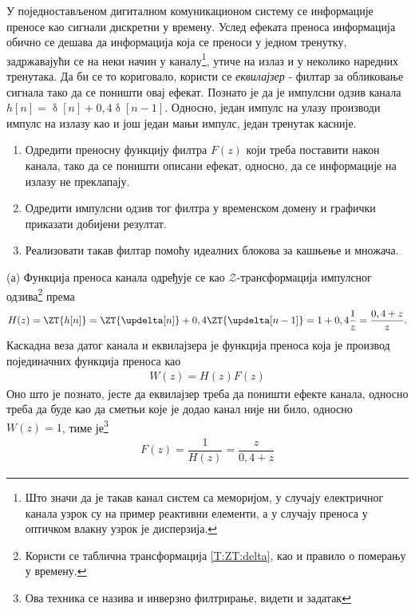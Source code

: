 \PID
У поједностављеном дигиталном комуникационом систему се информације преносе као сигнали дискретни у времену. 
Услед ефеката преноса информација обично се дешава да информација која се 
преноси у једном тренутку, задржавајући се на неки начин у каналу\footnote{Што значи да је такав канал систем са меморијом, у случају 
електричног канала узрок су на пример реактивни елементи, а у случају преноса у оптичком влакну узрок је дисперзија.}, утиче на излаз и у неколико наредних 
тренутака. Да би се то кориговало, користи се \textit{еквилајзер} - филтар за обликовање сигнала тако да се поништи овај ефекат. Познато је да је импулсни
одзив канала $h[n] = \updelta[n] + 0,4 \updelta[n-1]$. Односно, један импулс на улазу производи импулс на излазу као и још један мањи импулс, један 
тренутак касније. 
\begin{enumerate}[label=(\alph*)]
\item Одредити преносну функцију филтра $F(z)$ који треба поставити након канала, тако да се поништи описани ефекат, односно, да се информације на 
излазу не преклапају. 
\item Одредити импулсни одзив тог филтра у временском домену и графички приказати добијени резултат. 
\item Реализовати такав филтар помоћу идеалних блокова за кашњење и множача. 
\end{enumerate}

\RESENJE
(а) Функција преноса канала одређује се као $\mathcal{Z}$-трансформација импулсног одзива\footnote{
    Користи се таблична трансформација \ref{T:ZT:delta}, као и правило о померању у времену. 
} према 
\begin{eqnarray}
    H(z) = \ZT{h[n]} = \ZT{\updelta[n]} + 0,4 \ZT{\updelta[n-1]} 
                     = 1 + 0,4\dfrac{1}{z} = \dfrac{0,4 + z}{z}.
\end{eqnarray}
Каскадна веза датог канала и еквилајзера је функција преноса која је производ појединачних функција преноса као 
\begin{eqnarray}
    W(z) = H(z) F(z)
\end{eqnarray}
Оно што је познато, јесте да еквилајзер треба да поништи ефекте канала, односно треба да буде као да сметњи које је додао канал није ни било, 
односно $W(z) = 1$, тиме је\footnote{Ова техника се назива и инверзно филтрирање, видети и задатак }
\begin{eqnarray}
    F(z) = \dfrac{1}{H(z)} = \dfrac{z}{0,4 + z}
\end{eqnarray}

